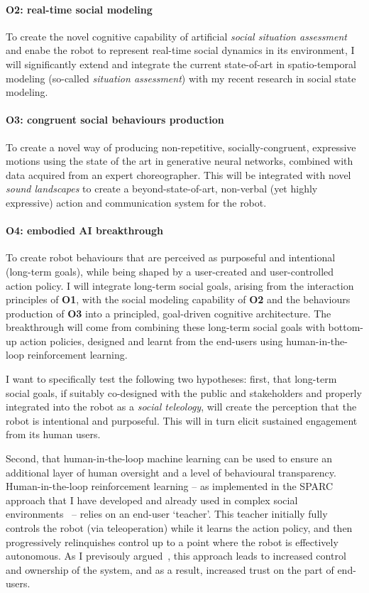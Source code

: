 \paragraph{\bf O2: real-time social modeling} To create the novel cognitive
capability of artificial \emph{social situation assessment} and enabe the
robot to represent real-time social dynamics in its environment, I will
significantly extend and integrate the current state-of-art in spatio-temporal
modeling (so-called \emph{situation assessment}) with my recent research in social
state modeling.

\paragraph{\bf O3: congruent social behaviours production} 
To create a novel way of producing non-repetitive, socially-congruent,
expressive motions using the state of the art in generative neural networks,
combined with data acquired from an expert choreographer. This will be
integrated with novel \emph{sound landscapes} to create a beyond-state-of-art,
non-verbal (yet highly expressive) action and communication system for the
robot.

\paragraph{\bf O4: embodied AI breakthrough} To create robot behaviours that are
perceived as purposeful and intentional (long-term goals), while being shaped by
a user-created and user-controlled action policy. I will integrate long-term
social goals, arising from the interaction principles of \textbf{O1}, with the
social modeling capability of \textbf{O2} and the behaviours production of
\textbf{O3} into a principled, goal-driven cognitive architecture. The
breakthrough will come from combining these long-term social goals with
bottom-up action policies, designed and learnt from the end-users using
human-in-the-loop reinforcement learning.

I want to specifically test the following two hypotheses: first, that long-term
social goals, if suitably co-designed with the public and stakeholders and
properly integrated into the robot as a \emph{social teleology}, will create the
perception that the robot is intentional and purposeful. This will in turn
elicit sustained engagement from its human users.

Second, that human-in-the-loop machine learning can
be used to ensure an additional layer of human oversight and a level of
behavioural transparency.  Human-in-the-loop reinforcement learning -- as
implemented in the SPARC approach that I have developed and already used in
complex social
environments~\parencite{senft2017supervised,senft2019teaching,winkle2020insitu}
-- relies on an end-user `teacher'. This teacher initially fully controls the
robot (via teleoperation) while it learns the action policy, and then
progressively relinquishes control up to a point where the robot is effectively
autonomous. As I previsouly argued~\parencite{senft2019teaching}, this approach
leads to increased control and ownership of the system, and as a result,
increased trust on the part of end-users.

